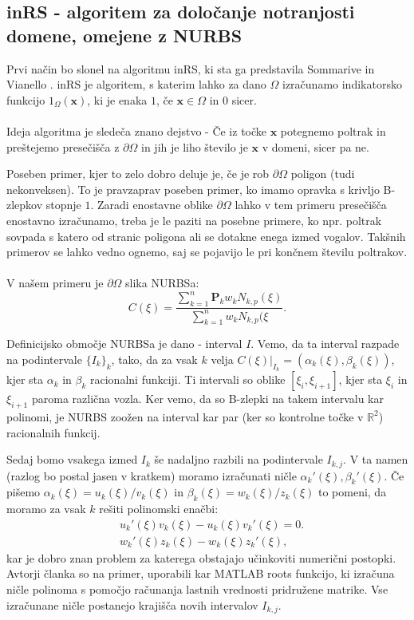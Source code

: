\documentclass{article}
\begin{document}
\subsection{inRS - algoritem za določanje notranjosti domene, omejene z NURBS}
Prvi način bo slonel na algoritmu inRS, ki sta ga predstavila Sommarive in Vianello \cite{inrs}.
inRS je algoritem, s katerim lahko za dano $\Omega$ izračunamo indikatorsko funkcijo $1_\Omega(\textbf{x})$, ki je enaka $1$, če $\textbf{x} \in \Omega$ in $0$ sicer.
\\
\\
Ideja algoritma je sledeča znano dejstvo - Če iz točke $\textbf{x}$ potegnemo poltrak in preštejemo presečišča z $\partial \Omega$ in jih je liho število je $\textbf{x}$ v domeni, sicer pa ne.

Poseben primer, kjer to zelo dobro deluje je, če je rob $\partial \Omega$ poligon (tudi nekonveksen). To je pravzaprav poseben primer, ko imamo opravka s krivljo B-zlepkov stopnje $1$. Zaradi enostavne oblike $\partial \Omega$ lahko v tem primeru presečišča enostavno izračunamo, treba je le paziti na posebne primere, ko npr. poltrak sovpada s katero od stranic poligona ali se dotakne enega izmed vogalov. Takšnih primerov se lahko vedno ognemo, saj se pojavijo le pri končnem številu poltrakov.
\\
\\
V našem primeru je $\partial \Omega$ slika NURBSa:
\begin{equation}
C(\xi) = \frac{\sum_{k=1}^n \textbf{P}_k w_k N_{k,p}(\xi)}{\sum_{k=1}^n w_k N_{k,p}(\xi}.
\end{equation}

Definicijsko območje NURBSa je dano - interval $I$. Vemo, da ta interval razpade na podintervale $\{I_k \}_k$, tako, da za vsak $k$ velja $C(\xi)|_{I_k} = (\alpha_k(\xi), \beta_k(\xi))$, kjer sta $\alpha_k$ in $\beta_k$ racionalni funkciji. Ti intervali so oblike $[\xi_i,\xi_{i+1}]$, kjer sta $\xi_i$ in $\xi_{i+1}$ paroma različna vozla. Ker vemo, da so B-zlepki na takem intervalu kar polinomi, je NURBS zoožen na interval kar par (ker so kontrolne točke v $\mathbb{R}^2$) racionalnih funkcij.


Sedaj bomo vsakega izmed $I_k$ še nadaljno razbili na podintervale $I_{k,j}$. V ta namen (razlog bo postal jasen v kratkem) moramo izračunati ničle $\alpha_k'(\xi), \beta_k'(\xi)$. Če pišemo $\alpha_k(\xi) = u_k(\xi)/v_k(\xi)$ in $\beta_k(\xi) = w_k(\xi)/z_k(\xi)$ to pomeni, da moramo za vsak $k$ rešiti polinomski enačbi:
\begin{align}
&u_k'(\xi) v_k(\xi) - u_k(\xi) v_k'(\xi) = 0. \\
&w_k'(\xi) z_k(\xi) - w_k(\xi) z_k'(\xi),
\end{align}
kar je dobro znan problem za katerega obstajajo učinkoviti numerični postopki. Avtorji članka so na primer, uporabili kar MATLAB roots funkcijo, ki izračuna ničle polinoma s pomočjo računanja lastnih vrednosti pridružene matrike. Vse izračunane ničle postanejo krajišča novih intervalov $I_{k,j}$. 
\end{document}
